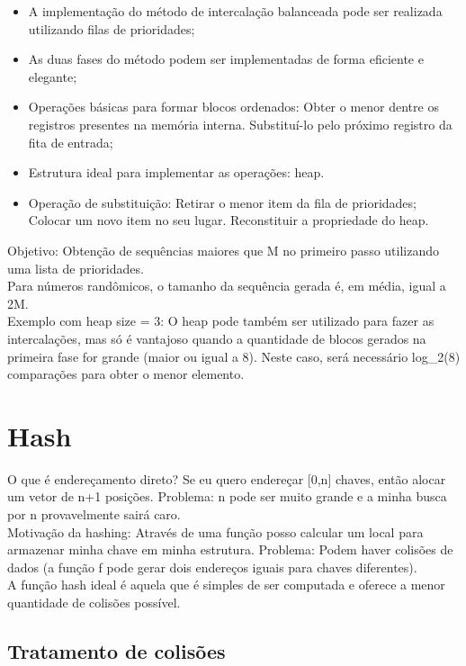 \documentclass{article}
\begin{document}
\begin{itemize}
   \item A implementação do método de intercalação balanceada pode ser realizada utilizando filas de
prioridades;
   \item As duas fases do método podem ser implementadas de forma eficiente e elegante;
   \item Operações básicas para formar blocos ordenados: Obter o menor dentre os registros presentes
na memória interna. Substituí-lo pelo próximo registro da fita de entrada;
   \item Estrutura ideal para implementar as operações: heap.
   \item Operação de substituição: Retirar o menor item da fila de prioridades; Colocar um novo item
no seu lugar. Reconstituir a propriedade do heap.
\end{itemize}

Objetivo: Obtenção de sequências maiores que M no primeiro passo utilizando uma lista de
prioridades.\\

Para números randômicos, o tamanho da sequência gerada é, em média, igual a 2M.\\

Exemplo com heap size = 3: O heap pode também ser utilizado para fazer as intercalações, mas só é
vantajoso quando a quantidade de blocos gerados na primeira fase for grande (maior ou igual a 8).  Neste caso,
será necessário log\_2(8) comparações para obter o menor elemento.

\section{Hash}

O que é endereçamento direto? Se eu quero endereçar [0,n] chaves, então alocar um vetor de n+1
posições. Problema: n pode ser muito grande e a minha busca por n provavelmente sairá caro.\\

Motivação da hashing: Através de uma função posso calcular um local para armazenar minha chave em
minha estrutura. Problema: Podem haver colisões de dados (a função f pode gerar dois endereços
iguais para chaves diferentes).\\

A função hash ideal é aquela que é simples de ser computada e oferece a menor quantidade de colisões
possível.

\subsection{Tratamento de colisões}
\end{document}
